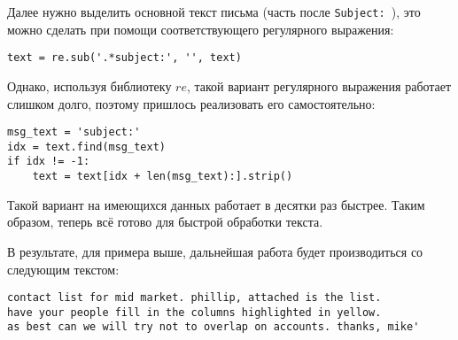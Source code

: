 Далее нужно выделить основной текст письма (часть после \texttt{Subject: }), это можно
сделать при помощи соответствующего регулярного выражения:

\begin{verbatim}
text = re.sub('.*subject:', '', text)
\end{verbatim}

Однако, используя библиотеку $re$, такой вариант регулярного выражения работает слишком долго, поэтому пришлось реализовать его самостоятельно:

\begin{verbatim}
msg_text = 'subject:'
idx = text.find(msg_text)
if idx != -1:
    text = text[idx + len(msg_text):].strip()
\end{verbatim}

Такой вариант на имеющихся данных работает в десятки раз быстрее. Таким образом, теперь
всё готово для быстрой обработки текста.

В результате, для примера выше, дальнейшая работа будет производиться со следующим текстом:
\begin{verbatim}
contact list for mid market. phillip, attached is the list. 
have your people fill in the columns highlighted in yellow. 
as best can we will try not to overlap on accounts. thanks, mike'
\end{verbatim}

